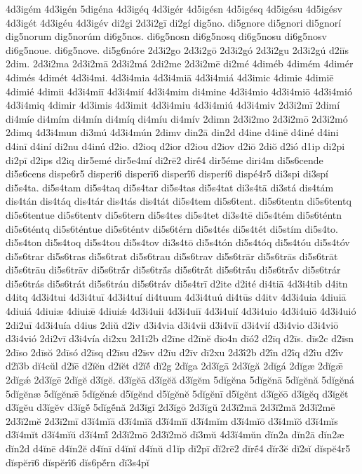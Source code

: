 {4d3igém
4d3igén
5digéna
4d3igéq
4d3igér
4d5igésn
4d5igésq
4d5igésu
4d5igésv
4d3igét
4d3igéu
4d3igév
di2gi
2d3i2gī
di2gí
dig5no.
di5gnore
di5gnori
di5gnorí
dig5norum
dig5norúm
di6g5nos.
di6g5nosn
di6g5nosq
di6g5nosu
di6g5nosv
di6g5noue.
di6g5nove.
di5g6nóre
2d3i2go
2d3i2gō
2d3i2gó
2d3i2gu
2d3i2gú
d2iīs
2dim.
2d3i2ma
2d3i2mā
2d3i2má
2di2me
2d3i2mē
di2mé
4diméb
4dimém
4dimér
4dimés
4dimét
4d3i4mi.
4d3i4mia
4d3i4miā
4d3i4miá
4d3imic
4dimie
4dimiē
4dimié
4dimii
4d3i4miī
4d3i4mií
4d3i4mim
di4mine
4d3i4mio
4d3i4miō
4d3i4mió
4d3i4miq
4dimir
4d3imis
4d3imit
4d3i4miu
4d3i4miú
4d3i4miv
2d3i2mī
2dimí
di4míe
di4mím
di4mín
di4míq
di4míu
di4mív
2dimn
2d3i2mo
2d3i2mō
2d3i2mó
2dimq
4d3i4mun
di3mú
4d3i4mún
2dimv
din2ā
din2d
d4ine
d4inē
d4iné
d4ini
d4inī
d4iní
di2nu
d4inú
d2io.
d2ioq
d2ior
d2iou
d2iov
d2iō
2diŏ
d2ió
d1ip
di2pi
di2pī
d2ips
d2iq
dir5emé
dir5e4mí
di2rē2
dirḗ4
dir5éme
diri4m
di5s6cende
di5s6cens
dispe6r5
disperi6
disperī6
disperī́6
disperí6
dispé4r5
di3spi
di3spí
di5s4ta.
di5s4tam
di5s4taq
di5s4tar
di5s4tas
di5s4tat
di3s4tā
di3stá
dis4tám
dis4tán
dis4táq
dis4tár
dis4tás
dis4tát
di5s4tem
di5s6tent.
di5s6tentn
di5s6tentq
di5s6tentue
di5s6tentv
di5s6tern
di5s4tes
di5s4tet
di3s4tē
di5s4tém
di5s6téntn
di5s6téntq
di5s6téntue
di5s6téntv
di5s6térn
di5s4tés
di5s4tét
di5stím
di5s4to.
di5s4ton
di5s4toq
di5s4tou
di5s4tov
di3s4tō
di5s4tón
di5s4tóq
di5s4tóu
di5s4tóv
di5s6trar
di5s6tras
di5s6trat
di5s6trau
di5s6trav
di5s6trār
di5s6trās
di5s6trāt
di5s6trāu
di5s6trāv
di5s6trā́r
di5s6trā́s
di5s6trā́t
di5s6trā́u
di5s6trā́v
di5s6trár
di5s6trás
di5s6trát
di5s6tráu
di5s6tráv
di5s4trī
d2ite
d2ité
di4tiā
4d3i4tib
d4itn
d4itq
4d3i4tui
4d3i4tuī
4d3i4tuí
di4tuum
4d3i4tuú
di4tūs
d4itv
4d3i4uia
4diuiā
4diuiá
4diuiæ
4diuiǣ
4diuiǽ
4d3i4uii
4d3i4uiī
4d3i4uií
4d3i4uio
4d3i4uiō
4d3i4uió
2di2uī
4d3i4uía
d4ius
2diŭ
d2iv
d3i4via
d3i4vii
d3i4viī
d3i4vií
d3i4vio
d3i4viō
d3i4vió
2di2vī
d3i4vía
di2xu
2d1ī2b
d2īne
d2īnĕ
dīo4n
dīó2
d2īq
d2īs.
dīs2c
d2īsn
2dīso
2dīsŏ
2dīsó
d2īsq
d2īsu
d2īsv
d2īu
d2īv
dī2xu
2d3ī́2b
d2ī́n
d2ī́q
d2ī́u
d2ī́v
d2ĭ3b
dĭ4cŭl
d2ĭē
d2ĭĕn
d2ĭĕt
d2ĭĕ́
dĭ2g
2dĭga
2d3ĭgā
2d3ĭgă
2dĭgá
2dĭgæ
2dĭgǣ
2dĭgǽ
2d3ĭgē
2dĭgĕ
d3ĭgĕ.
d3ĭgĕā
d3ĭgĕă
d3ĭgĕm
5dĭgĕna
5dĭgĕnā
5dĭgĕnă
5dĭgĕná
5dĭgĕnæ
5dĭgĕnǣ
5dĭgĕnǽ
d5ĭgĕnd
d5ĭgĕnĕ
5dĭgĕnī
d5ĭgĕnt
d3ĭgĕō
d3ĭgĕq
d3ĭgĕt
d3ĭgĕu
d3ĭgĕv
d3ĭgĕ́
5dĭgĕ́nă
2d3ĭgī
2d3ĭgō
2d3ĭgŭ
2d3ĭ2mā
2d3ĭ2mă
2d3ĭ2mē
2d3ĭ2mĕ
2d3ĭ2mī
d3ĭ4mĭā
d3ĭ4mĭă
d3ĭ4mĭī
d3ĭ4mĭm
d3ĭ4mĭō
d3ĭ4mĭŏ
d3ĭ4mĭs
d3ĭ4mĭt
d3ĭ4mĭŭ
d3ĭ4mĭ́
2d3ĭ2mō
2d3ĭ2mŏ
dĭ3mŭ
4d3ĭ4mŭn
dĭn2a
dĭn2ā
dĭn2æ
dĭn2d
d4ĭnē
d4ĭn2ĕ
d4ĭnī
d4ĭnĭ
d4ĭnŭ
d1ĭp
dĭ2pī
dĭ2rē2
dĭrḗ4
dĭr3ĕ
dĭ2sĭ
dĭspĕ4r5
dĭspĕrī6
dĭspĕrī́6
dĭs6pĕ́rn
dĭ3s4pĭ
}
